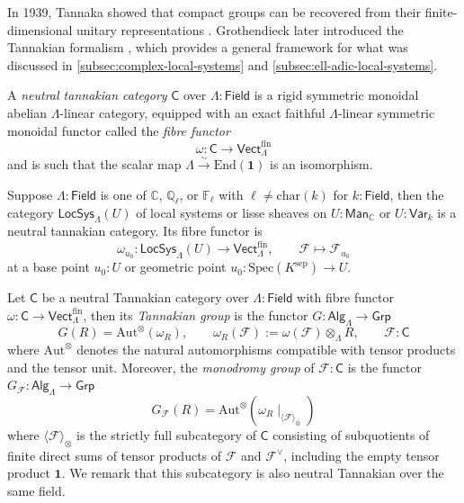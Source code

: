 \documentclass[11pt,letterpaper]{article}
\theoremstyle{numberfirstplain}
\numberwithin{equation}{theorem}
\theoremstyle{numberfirstupright}
\begin{document}
In 1939, Tannaka showed that compact groups can be recovered from their finite-dimensional unitary representations \cite{Tannaka1939}. Grothendieck later introduced the Tannakian formalism \cite[\S1]{Milne2025TannakianOrigins}, which provides a general framework for what was discussed in \cref{subsec:complex-local-systems} and \cref{subsec:ell-adic-local-systems}.

\begin{definition}A \textit{neutral tannakian category} $\mathsf{C}$ over $\Lambda:\mathsf{Field}$ is a rigid symmetric monoidal abelian $\Lambda$-linear category, equipped with an exact faithful $\Lambda$-linear symmetric monoidal functor called the \textit{fibre functor}
  $$\omega:\mathsf{C}\rightarrow \mathsf{Vect}_\Lambda^{\mathrm{fin}}$$
  and is such that the scalar map $\Lambda\xrightarrow{\sim}\mathrm{End}(\mathbf 1)$ is an isomorphism. 
\end{definition}

Suppose $\Lambda:\mathsf{Field}$ is one of $\mathbb C$, $\mathbb Q_\ell$, or $\mathbb F_\ell$  with $\ell\ne \mathrm{char}(k)$ for $k:\mathsf{Field}$, then
the category $\mathsf{LocSys}_{\Lambda}(U)$ of local systems or lisse sheaves on $U:\mathsf{Man}_{\mathbb C}$ or $U:\mathsf{Var}_{k}$ is a neutral tannakian category. 
Its fibre functor is 
$$\omega_{u_0}:\mathsf{LocSys}_{\Lambda}(U)\rightarrow \mathsf{Vect}_{\Lambda}^{\mathrm{fin}},\qquad \mathcal F\mapsto \mathcal F_{u_0}$$
at a base point $u_0:U$ or geometric point $u_0:\mathrm{Spec}(K^{\mathrm{sep}})\rightarrow U$.


\begin{definition}Let $\mathsf C$ be a neutral Tannakian category over $\Lambda:\mathsf{Field}$ with fibre functor $\omega:\mathsf{C}\rightarrow \mathsf{Vect}_\Lambda^{\mathrm{fin}}$, then its \textit{Tannakian group} is the functor $G:\mathsf{Alg}_\Lambda\rightarrow\mathsf{Grp}$
  $$G(R)=\mathrm{Aut}^{\otimes}(\omega_R),\qquad \omega_R(\mathcal F):=\omega(\mathcal F)\otimes_\Lambda R,\qquad {\mathcal F:\mathsf C}$$
  where $\mathrm{Aut}^\otimes$ denotes the natural automorphisms compatible with tensor products and the tensor unit. 
  Moreover, the \textit{monodromy group} of $\mathcal F:\mathsf C$ is the functor $G_\mathcal{F}:\mathsf{Alg}_\Lambda\rightarrow\mathsf{Grp}$
  $$G_{\mathcal F}(R)=\mathrm{Aut}^\otimes(\omega_R\mid_{\langle\mathcal F\rangle_\otimes})$$
  where $\langle\mathcal F\rangle_\otimes$ is the strictly full subcategory of $\mathsf C$ consisting of subquotients of finite direct sums of tensor products of $\mathcal F$ and $\mathcal F^\vee$, including the empty tensor product $\mathbf1$. 
  We remark that this subcategory is also neutral Tannakian over the same field. 
\end{definition}
\end{document}
